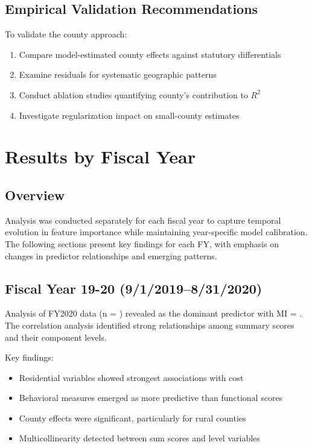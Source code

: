 \subsection{Empirical Validation Recommendations}

To validate the county approach:
\begin{enumerate}
    \item Compare model-estimated county effects against statutory differentials
    \item Examine residuals for systematic geographic patterns
    \item Conduct ablation studies quantifying county's contribution to $R^2$
    \item Investigate regularization impact on small-county estimates
\end{enumerate}

\newpage 

\section{Results by Fiscal Year}

\subsection{Overview}

Analysis was conducted separately for each fiscal year to capture temporal evolution in feature importance while maintaining year-specific model calibration. The following sections present key findings for each FY, with emphasis on changes in predictor relationships and emerging patterns.

\subsection{Fiscal Year 19-20 (9/1/2019--8/31/2020)}

Analysis of FY2020 data (n = \FSRecordsFinalFYTwoThousandTwenty) revealed \FSTopFeatureFYTwoThousandTwenty{} as the dominant predictor with MI = \FSTopMIFYTwoThousandTwenty. The correlation analysis identified strong relationships among summary scores and their component levels.

Key findings:
\begin{itemize}
    \item Residential variables showed strongest associations with cost
    \item Behavioral measures emerged as more predictive than functional scores
    \item County effects were significant, particularly for rural counties
    \item Multicollinearity detected between sum scores and level variables
\end{itemize}

